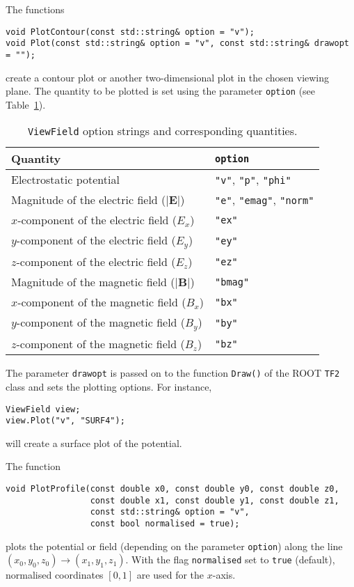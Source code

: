 The functions 
\begin{lstlisting}
void PlotContour(const std::string& option = "v");
void Plot(const std::string& option = "v", const std::string& drawopt = "");
\end{lstlisting}
create a contour plot or another two-dimensional plot in the chosen viewing plane.
The quantity to be plotted is set using the parameter \texttt{option} 
(see Table~\ref{Tab:ViewFieldOptionStrings}).
\begin{table}
  \centering
  \caption{\texttt{ViewField} option strings and corresponding quantities.}
  \label{Tab:ViewFieldOptionStrings}
  \begin{tabular}{l l} 
    \toprule
    Quantity & \texttt{option} \\
    \midrule
    Electrostatic potential & \texttt{"v"}, \texttt{"p"}, \texttt{"phi"} \\
    Magnitude of the electric field ($\left|\mathbf{E}\right|$) & \texttt{"e"}, \texttt{"emag"}, \texttt{"norm"} \\
    $x$-component of the electric field ($E_{x}$) & \texttt{"ex"} \\ 
    $y$-component of the electric field ($E_{y}$) & \texttt{"ey"} \\ 
    $z$-component of the electric field ($E_{z}$) & \texttt{"ez"} \\
    \midrule 
    Magnitude of the magnetic field ($\left|\mathbf{B}\right|$) & \texttt{"bmag"} \\
    $x$-component of the magnetic field ($B_{x}$) & \texttt{"bx"} \\ 
    $y$-component of the magnetic field ($B_{y}$) & \texttt{"by"} \\ 
    $z$-component of the magnetic field ($B_{z}$) & \texttt{"bz"} \\ 
    \bottomrule
  \end{tabular}
\end{table}
The parameter \texttt{drawopt} is passed on to the function \texttt{Draw()} of the
ROOT \texttt{TF2} class and sets the plotting options. For instance,
\begin{lstlisting}
ViewField view;
view.Plot("v", "SURF4");
\end{lstlisting}
will create a surface plot of the potential.

The function 
\begin{lstlisting}
void PlotProfile(const double x0, const double y0, const double z0,
                 const double x1, const double y1, const double z1,
                 const std::string& option = "v",
                 const bool normalised = true);
\end{lstlisting}
plots the potential or field (depending on the parameter \texttt{option}) 
along the line  
\(\left(x_{0}, y_{0}, z_{0}\right) \rightarrow 
  \left(x_{1}, y_{1}, z_{1}\right)\).
With the flag \texttt{normalised} set to \texttt{true} (default), 
normalised coordinates $\left[0, 1\right]$ are used for the $x$-axis. 

